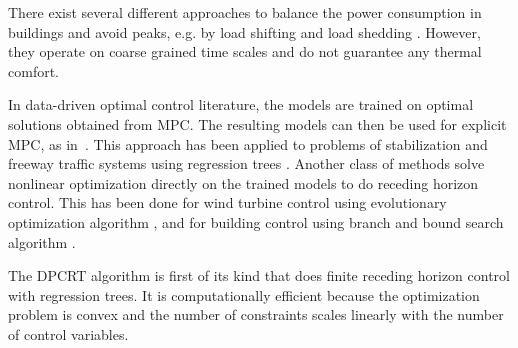 There exist several different approaches to balance the power consumption in buildings and avoid peaks, e.g. by load shifting and load shedding \cite{KiliccoteEtAl06aca,LeeEtAl08dom}.
However, they operate on coarse grained time scales and do not guarantee any thermal comfort.

In data-driven optimal control literature, the models are trained on optimal solutions obtained from MPC. The resulting models can then be used for explicit MPC, as in~\cite{BemporadMorariDuaEtAl2002}. This approach has been applied to problems of  stabilization \cite{CavagnariMagniScattolini1999} and freeway traffic systems using regression trees \cite{OleariFrejoCamachoEtAl2015}. 
Another class of methods solve nonlinear optimization directly on the trained models to do receding horizon control. This has been done for wind turbine control using evolutionary optimization algorithm \cite{KusiakSongZheng2009}, and for building control using branch and bound search algorithm \cite{FerreiraRuanoSilvaEtAl2012}. 


The DPCRT algorithm is first of its kind that does finite receding horizon control with regression trees. 
It is computationally efficient because the optimization problem is convex and the number of constraints scales linearly with the number of control variables. 
